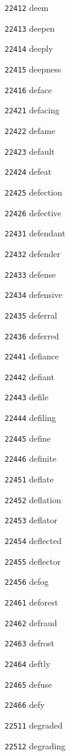 \documentclass[twoside,11pt]{article}
\begin{document}
\begin{multicols}{5}
\begin{enumerate}
\item[\texttt{22412}] deem
\item[\texttt{22413}] deepen
\item[\texttt{22414}] deeply
\item[\texttt{22415}] deepness
\item[\texttt{22416}] deface
\item[\texttt{22421}] defacing
\item[\texttt{22422}] defame
\item[\texttt{22423}] default
\item[\texttt{22424}] defeat
\item[\texttt{22425}] defection
\item[\texttt{22426}] defective
\item[\texttt{22431}] defendant
\item[\texttt{22432}] defender
\item[\texttt{22433}] defense
\item[\texttt{22434}] defensive
\item[\texttt{22435}] deferral
\item[\texttt{22436}] deferred
\item[\texttt{22441}] defiance
\item[\texttt{22442}] defiant
\item[\texttt{22443}] defile
\item[\texttt{22444}] defiling
\item[\texttt{22445}] define
\item[\texttt{22446}] definite
\item[\texttt{22451}] deflate
\item[\texttt{22452}] deflation
\item[\texttt{22453}] deflator
\item[\texttt{22454}] deflected
\item[\texttt{22455}] deflector
\item[\texttt{22456}] defog
\item[\texttt{22461}] deforest
\item[\texttt{22462}] defraud
\item[\texttt{22463}] defrost
\item[\texttt{22464}] deftly
\item[\texttt{22465}] defuse
\item[\texttt{22466}] defy
\item[\texttt{22511}] degraded
\item[\texttt{22512}] degrading

\end{enumerate}
\end{multicols}
\end{document}
